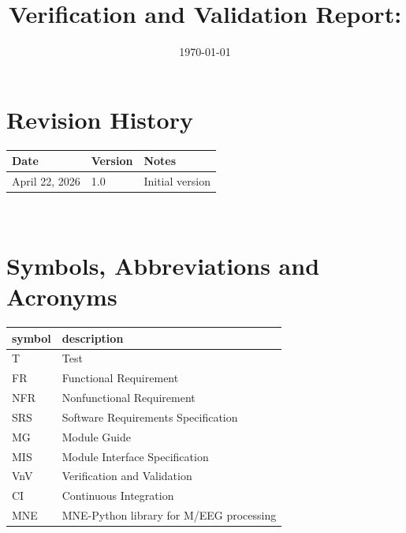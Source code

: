 \documentclass[12pt, titlepage]{article}
\begin{document}
\title{Verification and Validation Report: \progname}
\author{\authname}
\date{\today}

\maketitle


\section{Revision History}

\begin{tabularx}{\textwidth}{p{3cm}p{2cm}X}
\toprule {\bf Date} & {\bf Version} & {\bf Notes}\\
\midrule
April 22, 2026 & 1.0 & Initial version \\
\bottomrule
\end{tabularx}

~\newpage

\section{Symbols, Abbreviations and Acronyms}

\renewcommand{\arraystretch}{1.2}
\begin{tabular}{l l}
  \toprule
  \textbf{symbol} & \textbf{description}\\
  \midrule
  T & Test\\
  FR & Functional Requirement\\
  NFR & Nonfunctional Requirement\\
  SRS & Software Requirements Specification\\
  MG & Module Guide\\
  MIS & Module Interface Specification\\
  VnV & Verification and Validation\\
  CI & Continuous Integration\\
  MNE & MNE-Python library for M/EEG processing\\
  \bottomrule
\end{tabular}\\

\newpage

\tableofcontents

\listoftables

\listoffigures

\newpage

\end{document}
